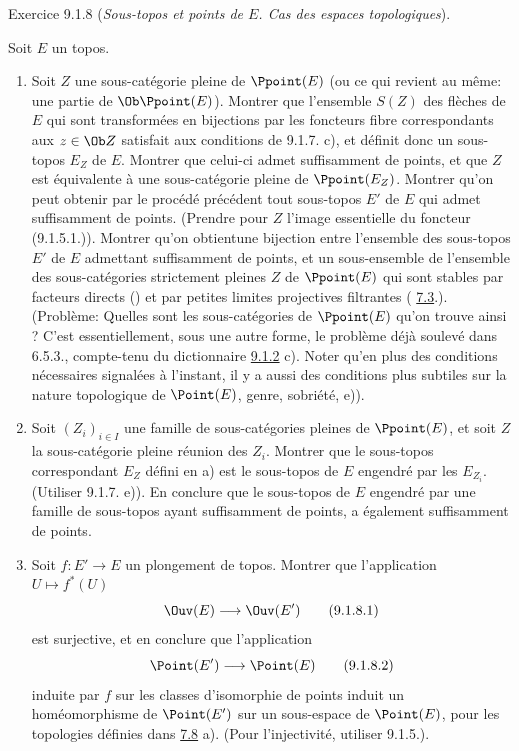 \begin{enonce*}[remark]{Exercice 9.1.8}
(\emph{Sous-topos et points de $E$. Cas des espaces topologiques}).

Soit $E$ un topos.
\begin{enumerate}
\renewcommand{\theenumi}{\alph{enumi}}
\renewcommand{\labelenumi}{\theenumi)}
\item Soit $Z$ une sous-catégorie pleine de $\Ppoint(E)$ (ou ce qui
revient au même: une partie de $\Ob \Ppoint(E)$). Montrer que
l'ensemble $S(Z)$ des flèches de $E$ qui sont transformées en
bijections par les foncteurs fibre correspondants aux $z\in \Ob Z$
satisfait aux conditions de 9.1.7. c), et définit donc un sous-topos
$E_Z$ de $E$. Montrer que celui-ci admet suffisamment de points, et
que $Z$ est équivalente à une sous-catégorie pleine de
$\Ppoint(E_Z)$. Montrer qu'on peut obtenir par le procédé précédent
tout sous-topos $E'$ de $E$ qui admet suffisamment de points.
(Prendre pour $Z$ l'image essentielle du foncteur (9.1.5.1.)).
Montrer qu'on obtient\pageoriginale une bijection entre l'ensemble
des sous-topos $E'$ de $E$ admettant suffisamment de points, et un
sous-ensemble de l'ensemble des sous-catégories strictement pleines
$Z$ de $\Ppoint(E)$ qui sont stables par facteurs directs
() et par petites limites projectives filtrantes (\cf
\hyperref[IV.subsec7.3]{7.3}.). (Problème: Quelles sont les sous-catégories de
$\Ppoint(E)$ qu'on trouve ainsi ? C'est essentiellement, sous une
autre forme, le problème déjà soulevé dans 6.5.3., compte-tenu du
dictionnaire \hyperref[IV.rem9.1.2]{9.1.2} c). Noter qu'en plus des conditions
nécessaires signalées à l'instant, il y a aussi des conditions plus
subtiles sur la nature topologique de $\Point(E)$, genre, sobriété,
\cf e)).

\item Soit $(Z_i)_{i\in I}$ une famille de sous-catégories pleines de
$\Ppoint(E)$, et soit $Z$ la sous-catégorie pleine réunion des
$Z_i$. Montrer que le sous-topos correspondant $E_Z$ défini en a)
est le sous-topos de $E$ engendré par les $E_{Z_i}$. (Utiliser
9.1.7. e)). En conclure que le sous-topos de $E$ engendré par une
famille de sous-topos ayant suffisamment de points, a également
suffisamment de points.

\item Soit $f:E'\rightarrow E$ un plongement de topos. Montrer que
l'application $U\mapsto f^{\ast}(U)$
\begin{equation*}
\Ouv(E)\longrightarrow \Ouv(E')\tag{9.1.8.1}
\end{equation*}
est surjective, et en conclure que l'application
\begin{equation*}
\Point(E')\longrightarrow \Point(E)\tag{9.1.8.2}
\end{equation*}
induite par $f$ sur les classes d'isomorphie de points induit un
homéomorphisme de $\Point(E')$ sur un sous-espace de $\Point(E)$,
pour les topologies définies dans \hyperref[IV.exer7.8]{7.8} a). (Pour
l'injectivité, utiliser 9.1.5.).


\end{enumerate}
\end{enonce*}
